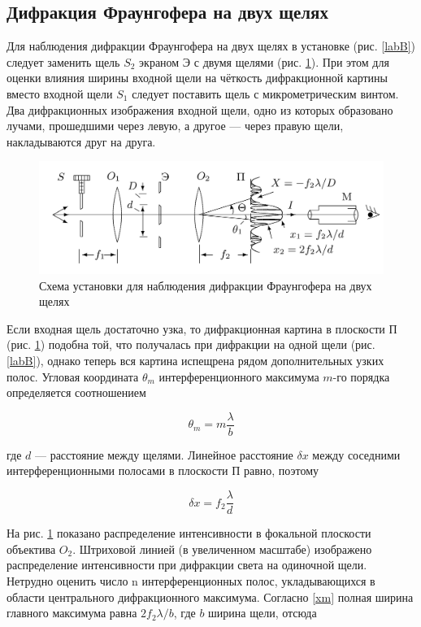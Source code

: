 \documentclass[a4paper,12pt]{article} %
\begin{document}
\subsection{Дифракция Фраунгофера на двух щелях}

Для наблюдения дифракции Фраунгофера на двух щелях в установке (рис. \ref{labB}) следует заменить щель $ S_2 $ экраном Э с двумя щелями
(рис. \ref{labC}). При этом для оценки влияния ширины входной щели на чёткость дифракционной картины вместо входной щели $ S_1 $ следует поставить щель с микрометрическим винтом. Два дифракционных изображения входной щели, одно из которых образовано лучами, прошедшими через левую, а другое --- через правую щели, накладываются друг на друга.

\begin{figure}[H]
	\centering
	\includegraphics[scale=0.15]{clab.jpeg}
	\caption{Схема установки для наблюдения дифракции Фраунгофера на двух щелях}
	\label{labC}
\end{figure}

Если входная щель достаточно узка, то дифракционная картина
в плоскости П (рис. \ref{labC}) подобна той, что получалась при дифракции
на одной щели (рис. \ref{labB}), однако теперь вся картина испещрена рядом
дополнительных узких полос.
Угловая координата $ \theta_m $ интерференционного максимума $ m $-го порядка определяется соотношением

\begin{equation}\label{}
\theta_m = m \dfrac{\lambda}{b}
\end{equation}

где $ d $ --- расстояние между щелями. Линейное расстояние $ \delta x $ между соседними интерференционными полосами в плоскости П равно, поэтому

\begin{equation}\label{dx}
\delta x = f_2 \dfrac{\lambda}{d}
\end{equation}

На рис. \ref{labC} показано распределение интенсивности в фокальной плоскости объектива $ O_2 $. Штриховой линией (в увеличенном масштабе)
изображено распределение интенсивности при дифракции света на одиночной щели. Нетрудно оценить число n интерференционных полос,
укладывающихся в области центрального дифракционного максимума.
Согласно \eqref{xm} полная ширина главного максимума равна $ 2 f_2 \lambda /b $, где $ b $ ширина щели, отсюда
\end{document}

